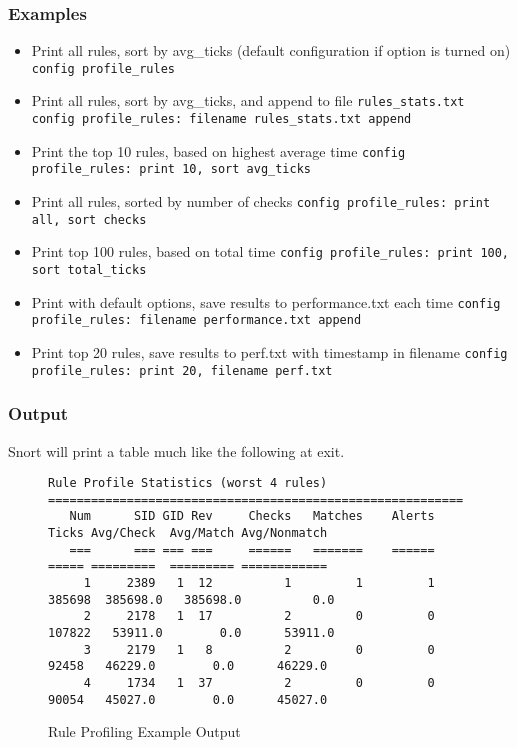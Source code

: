 \documentclass[english]{report}
\begin{document}
\subsubsection{Examples}
\begin{itemize}

\item Print all rules, sort by avg\_ticks (default configuration if option is turned on)
\subitem \texttt{config profile\_rules}

\item Print all rules, sort by avg\_ticks, and append to file \texttt{rules\_stats.txt} 
\subitem \texttt{config profile\_rules: filename \texttt{rules\_stats.txt} append}

\item Print the top 10 rules, based on highest average time
\subitem \texttt{config profile\_rules: print 10, sort avg\_ticks}

\item Print all rules, sorted by number of checks
\subitem \texttt{config profile\_rules: print all, sort checks}

\item Print top 100 rules, based on total time
\subitem \texttt{config profile\_rules: print 100, sort total\_ticks}

\item Print with default options, save results to performance.txt each time
\subitem \texttt{config profile\_rules: filename performance.txt append}

\item Print top 20 rules, save results to perf.txt with timestamp in filename
\subitem \texttt{config profile\_rules: print 20, filename perf.txt}

\end{itemize}

\subsubsection{Output}

Snort will print a table much like the following at exit.  

\begin{figure}
\footnotesize{
\begin{verbatim}
Rule Profile Statistics (worst 4 rules)
==========================================================
   Num      SID GID Rev     Checks   Matches    Alerts               Ticks Avg/Check  Avg/Match Avg/Nonmatch
   ===      === === ===     ======   =======    ======               ===== =========  ========= ============
     1     2389   1  12          1         1         1              385698  385698.0   385698.0          0.0
     2     2178   1  17          2         0         0              107822   53911.0        0.0      53911.0
     3     2179   1   8          2         0         0               92458   46229.0        0.0      46229.0
     4     1734   1  37          2         0         0               90054   45027.0        0.0      45027.0
\end{verbatim}
}
\caption{\label{rule profiling example output}Rule Profiling Example Output}
\end{figure}
\end{document}
